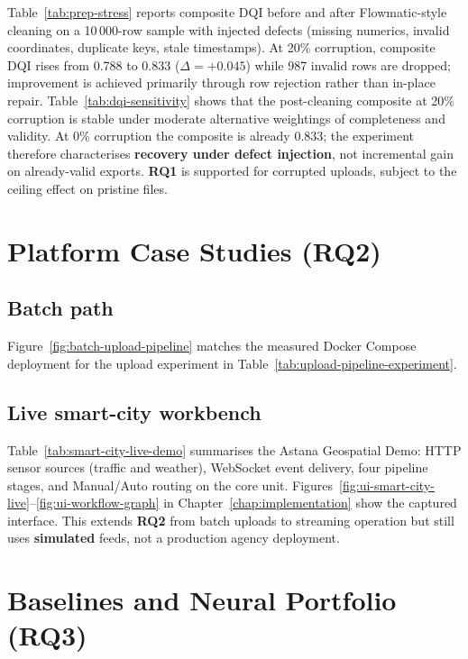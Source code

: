 Table~\ref{tab:prep-stress} reports composite DQI before and after Flowmatic-style cleaning on a 10\,000-row sample with injected defects (missing numerics, invalid coordinates, duplicate keys, stale timestamps). At 20\% corruption, composite DQI rises from 0.788 to 0.833 ($\Delta{=}+0.045$) while 987 invalid rows are dropped; improvement is achieved primarily through row rejection rather than in-place repair. Table~\ref{tab:dqi-sensitivity} shows that the post-cleaning composite at 20\% corruption is stable under moderate alternative weightings of completeness and validity. At 0\% corruption the composite is already 0.833; the experiment therefore characterises \textbf{recovery under defect injection}, not incremental gain on already-valid exports. \textbf{RQ1} is supported for corrupted uploads, subject to the ceiling effect on pristine files.




\section{Platform Case Studies (RQ2)}
\label{sec:platform_cases}

\subsection{Batch path}

Figure~\ref{fig:batch-upload-pipeline} matches the measured Docker Compose deployment for the upload experiment in Table~\ref{tab:upload-pipeline-experiment}.

\subsection{Live smart-city workbench}

Table~\ref{tab:smart-city-live-demo} summarises the Astana Geospatial Demo: HTTP sensor sources (traffic and weather), WebSocket event delivery, four pipeline stages, and Manual/Auto routing on the core unit. Figures~\ref{fig:ui-smart-city-live}--\ref{fig:ui-workflow-graph} in Chapter~\ref{chap:implementation} show the captured interface. This extends \textbf{RQ2} from batch uploads to streaming operation but still uses \textbf{simulated} feeds, not a production agency deployment.

\section{Baselines and Neural Portfolio (RQ3)}
\label{sec:neural_portfolio}

